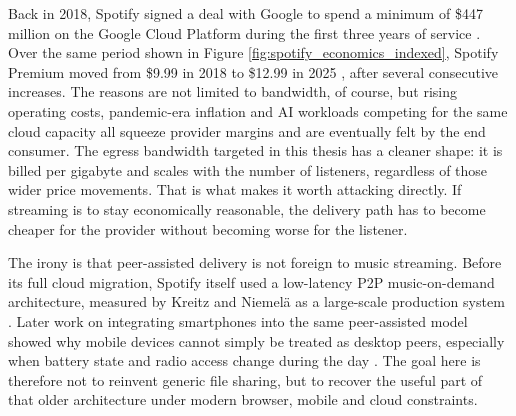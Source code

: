 \par Back in 2018, Spotify signed a deal with Google to spend a minimum of \$447 million on the Google Cloud Platform during the first three years of service \cite{spotify_google}. Over the same period shown in Figure \ref{fig:spotify_economics_indexed}, Spotify Premium moved from \$9.99 in 2018 to \$12.99 in 2025 \cite{spotify_prices}, after several consecutive increases. The reasons are not limited to bandwidth, of course, but rising operating costs, pandemic-era inflation and AI workloads competing for the same cloud capacity all squeeze provider margins and are eventually felt by the end consumer. The egress bandwidth targeted in this thesis has a cleaner shape: it is billed per gigabyte and scales with the number of listeners, regardless of those wider price movements. That is what makes it worth attacking directly. If streaming is to stay economically reasonable, the delivery path has to become cheaper for the provider without becoming worse for the listener.

\par The irony is that peer-assisted delivery is not foreign to music streaming. Before its full cloud migration, Spotify itself used a low-latency P2P music-on-demand architecture, measured by Kreitz and Niemel\"a as a large-scale production system \cite{spotify_p2p}. Later work on integrating smartphones into the same peer-assisted model showed why mobile devices cannot simply be treated as desktop peers, especially when battery state and radio access change during the day \cite{spotify_mobile_p2p}. The goal here is therefore not to reinvent generic file sharing, but to recover the useful part of that older architecture under modern browser, mobile and cloud constraints.

